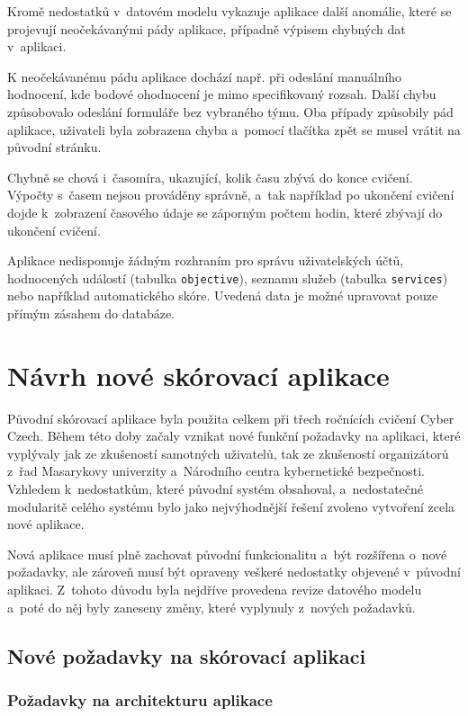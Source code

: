 \documentclass[
  digital,
  twoside,
  table, 
  nolof, 
  nolot
]{fithesis3}
\begin{document}
Kromě nedostatků v~datovém modelu vykazuje aplikace další anomálie, které se projevují neočekávanými pády aplikace, případně výpisem chybných dat v~aplikaci.

K neočekávanému pádu aplikace dochází např. při odeslání manuálního hodnocení, kde bodové ohodnocení je mimo specifikovaný rozsah. Další chybu způsobovalo odeslání formuláře bez vybraného týmu. Oba případy způsobily pád aplikace, uživateli byla zobrazena chyba a~pomocí tlačítka zpět se musel vrátit na původní stránku.

Chybně se chová i~časomíra, ukazující, kolik času zbývá do konce cvičení. Výpočty s~časem nejsou prováděny správně, a~tak například po ukončení cvičení dojde k~zobrazení časového údaje se záporným počtem hodin, které zbývají do ukončení cvičení.

Aplikace nedisponuje žádným rozhraním pro správu uživatelských účtů, hodnocených událostí (tabulka \texttt{objective}), seznamu služeb (tabulka \texttt{services}) nebo například automatického skóre. Uvedená data je možné upravovat pouze přímým zásahem do databáze.

\chapter{Návrh nové skórovací aplikace}
\label{newApp}
Původní skórovací aplikace byla použita celkem při třech ročnících cvičení Cyber Czech. Během této doby začaly vznikat nové funkční požadavky na aplikaci, které vyplývaly jak ze zkušeností samotných uživatelů, tak ze zkušeností organizátorů z~řad Masarykovy univerzity a~Národního centra kybernetické bezpečnosti. Vzhledem k~nedostatkům, které původní systém obsahoval, a~nedostatečné modularitě celého systému bylo jako nejvýhodnější řešení zvoleno vytvoření zcela nové aplikace. 

Nová aplikace musí plně zachovat původní funkcionalitu a~být rozšířena o~nové požadavky, ale zároveň musí být opraveny veškeré nedostatky objevené v~původní aplikaci. Z~tohoto důvodu byla nejdříve provedena revize datového modelu a~poté do něj byly zaneseny změny, které vyplynuly z~nových požadavků. 

\section{Nové požadavky na skórovací aplikaci}
\subsection{Požadavky na architekturu aplikace}
\end{document}
